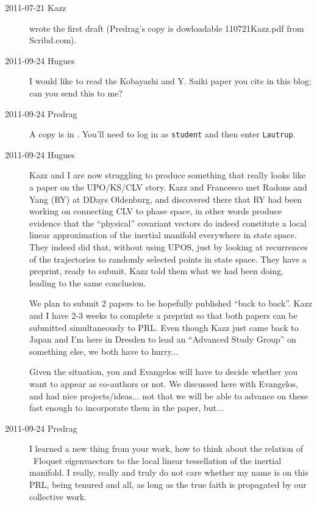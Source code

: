 \begin{description}
\item[2011-07-21 Kazz] wrote the first draft (Predrag's
copy is dowloadable
{110721Kazz.pdf} from Scribd.com).

\item[2011-09-24 Hugues]
I would like to read the  Kobayashi and Y. Saiki paper you
cite in this blog; can you send this to me?

\item[2011-09-24 Predrag]
A copy is in
.
You'll need to log in as \texttt{student} and then enter \texttt{Lautrup}.

\item[2011-09-24 Hugues]
Kazz and I are now struggling to produce something that really looks like
a paper on the UPO/KS/CLV story. Kazz and Francesco met Radons and Yang
(RY) at DDays Oldenburg, and discovered there that RY had been working on
connecting CLV to phase space, in other words produce evidence that the
``physical'' covariant vectors do indeed constitute a local linear
approximation of the inertial manifold everywhere in state space. They
indeed did that, without using UPOS, just by looking at recurrences of
the trajectories to randomly selected points in state space. They have a
preprint, ready to submit. Kazz told them what we had been doing, leading
to the same conclusion.

We plan to submit 2 papers to be hopefully published ``back to back''.
Kazz and I have 2-3 weeks to complete a preprint so that both papers can
be submitted simultaneously to PRL. Even though Kazz just came back to
Japan and I'm here in Dresden to lead an ``Advanced Study Group'' on
something else, we both have to hurry...

Given the situation, you  and Evangelos  will have to decide
whether you want to appear as co-authors or not. We discussed
here with Evangelos, and had nice projects/ideas... not that we will be
able to advance on these fast enough to incorporate them in the paper,
but...

\item[2011-09-24 Predrag]
I learned a new thing from your work, how to think about the relation of
\po\ Floquet eigenvaectors to the local linear tessellation of the
inertial manifold.
I really, really and truly do not care whether my name is on this PRL,
being tenured and all, as long as the true faith is propagated by our
collective work.


\end{description}
